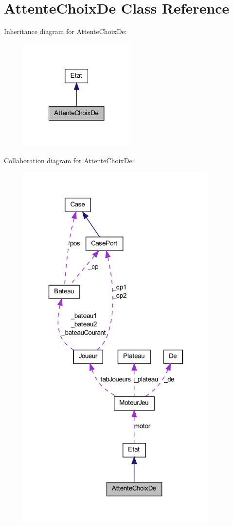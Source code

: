 \hypertarget{class_attente_choix_de}{
\section{AttenteChoixDe Class Reference}
\label{class_attente_choix_de}
}


Inheritance diagram for AttenteChoixDe:
\nopagebreak
\begin{figure}[H]
\begin{center}
\leavevmode
\includegraphics[width=164pt]{class_attente_choix_de__inherit__graph}
\end{center}
\end{figure}


Collaboration diagram for AttenteChoixDe:
\nopagebreak
\begin{figure}[H]
\begin{center}
\leavevmode
\includegraphics[width=285pt]{class_attente_choix_de__coll__graph}
\end{center}
\end{figure}
